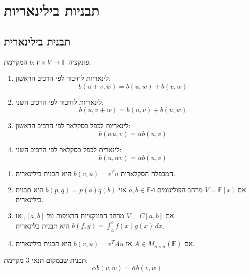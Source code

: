 \documentclass{tstextbook}
\begin{document}
\chapter{תבניות בילינאריות}

\section{תבנית בילינארית}

\begin{definition}
פונקציה \(b:V\times V\rightarrow \mathbb F\) המקיימת:

  \begin{enumerate}
    \item לינאריות לחיבור לפי הרכיב הראשון: 
$$b(u+v,w)=b(u,w)+b(v,w)$$


    \item לינאריות לחיבור לפי הרכיב השני: 
$$b(u,v+w)=b(u,v)+b(u,w)$$


    \item לינאריות לכפל בסקלאר לפי הרכיב הראשון: 
$$b(\alpha u,v)=\alpha b(u,v)$$


    \item לינארית לכפל בסקלאר לפי הרכיב השני: 
$$b\left( u,\alpha v \right)=\alpha b(u,v)$$


  \end{enumerate}
\end{definition}
\begin{example}
  \begin{enumerate}
    \item המכפלה הסקלארית \(b(v,u)=v^{T}u\) היא תבנית בילינארית. 


    \item אם \(V=\mathbb{F} [x]\) מרחב הפולינומים ו-\(a,b \in \mathbb{F}\) אזי \(b(p,q)=p(a)q(b)\) היא תבנית בילינארית. 


    \item אם \(V=C[a,b]\) מרחב הפונקציות הרציפות על \([a,b]\), אז \(b(f,g)=\int_{a}^{b} f(x)g(x) \, dx\) היא תבנית בלינארית. 


    \item אם \(A \in M_{n\times n}\left( \mathbb{F}  \right)\) אז \(b(v,u)=v^{T}Au\) היא תבנית בילינארית. 


  \end{enumerate}
\end{example}
\begin{definition}
תבנית שבמקום תנאי 3 מקיימת:
$$ \alpha b(v, w) = \overline \alpha b( v, w )$$

\end{definition}
\end{document}
